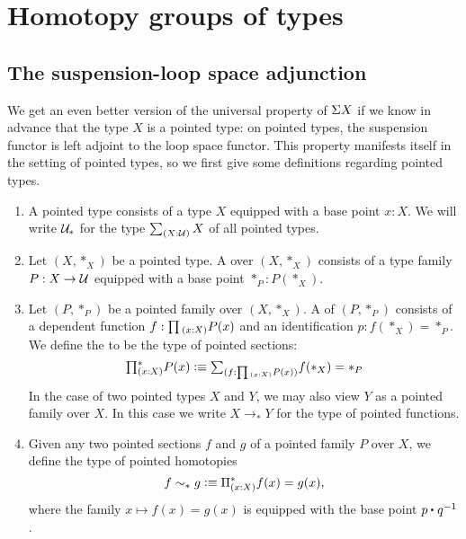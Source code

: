 \section{Homotopy groups of types}

\subsection{The suspension-loop space adjunction}

We get an even better version of the universal property of $\Sigma{X}$ if we know in advance that the type $X$ is a pointed type: on pointed types, the suspension functor is left adjoint to the loop space functor. This property manifests itself in the setting of pointed types, so we first give some definitions regarding pointed types.

\begin{defn}
\begin{enumerate}
\item A pointed type consists of a type $X$ equipped with a base point $x:X$. We will write $\mathcal{U}_\ast$ for the type $\sm{X:\UU}X$ of all pointed types.
\item Let $(X,\ast_X)$ be a pointed type. A  over $(X,\ast_X)$ consists of a type family $P:X\to \mathcal{U}$ equipped with a base point $\ast_P:P(\ast_X)$. 
\item Let $(P,\ast_P)$ be a pointed family over $(X,\ast_X)$. A  of $(P,\ast_P)$ consists of a dependent function $f:\prd{x:X}P(x)$ and an identification $p:f(\ast_X)=\ast_P$. We define the  to be the type of pointed sections:
\begin{equation*}
\prdsym^\ast_{(x:X)}P(x) \defeq \sm{f:\prd{x:X}P(x)}f(\ast_X)=\ast_P
\end{equation*}
In the case of two pointed types $X$ and $Y$, we may also view $Y$ as a pointed family over $X$. In this case we write $X\to_\ast Y$ for the type of pointed functions.
\item Given any two pointed sections $f$ and $g$ of a pointed family $P$ over $X$, we define the type of pointed homotopies
\begin{equation*}
f\sim_\ast g \vcentcolon\equiv \Pi^\ast_{(x:X)} f(x)=g(x),
\end{equation*}
where the family $x\mapsto f(x)=g(x)$ is equipped with the base point $\ct{p}{q^{-1}}$. 
\end{enumerate}
\end{defn}

